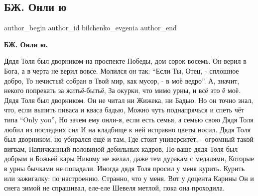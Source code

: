 
 
 
 
 
 
\subsection{БЖ. Онли ю}
\label{sec:27_06_2021.fb.bilchenko_evgenia.2.only_you}
\ifcmt
 author_begin
   author_id bilchenko_evgenia
 author_end
\fi

\begin{center}
\large
\textbf{БЖ. Онли ю.}
\end{center}

\begin{multicols}{2}
\obeycr
\noindent 
\lettrine[findent=2pt]{\textbf{Д}}{}ядя Толя был дворником на проспекте Победы, дом сорок восемь.
Он верил в Бога, а в черта не верил вовсе.
Молился он так: \enquote{Если Ты, Отец, - сплошное добро,
То нечистый собран в Твой мир, как мусор, - в моё ведро}.
\smallskip
А, значит, некого попрекать за житьё-бытьё,
За окурки, что мимо урны, и всё это ё моё.
Дядя Толя был дворником. Он не читал ни Жижека, ни Бадью.
Но он точно знал, что, если выпить пиваса и кваса бадью,
\smallskip
Можно чуть поднапрячься и спеть чёт типа \enquote{Only  you},
Но зачем ему онли-я, если есть семья, а семью свою
Дядя Толя любил из последних сил
И на кладбище к ней исправно цветы носил.
\smallskip
Дядя Толя был дворником, но убирался ещё и там,
Где стоит университет, - огромный такой вигвам,
Напичканный половиной дебильных кадров,
Но ваще дядя Толя был добрым и Божьей кары
\smallskip
Никому не желал, даже тем дуракам с медалями,
Которые в урны бычками не попадали.
Иногда дядя Толя просил у меня курить.
Курить или зажигалку: по настроению.
\smallskip
Странно, что у меня. Вот у доцента Карины
Он и снега зимой не спрашивал, еле-еле
Шевеля метлой, пока она проходила.
\restorecr
\end{multicols}


